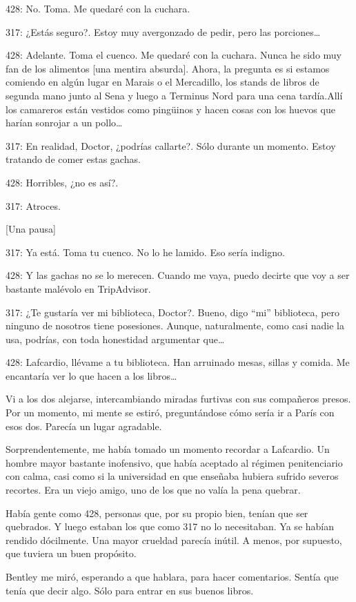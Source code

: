 428: No. Toma. Me quedaré con la cuchara.

317: ¿Estás seguro?. Estoy muy avergonzado de pedir, pero las
porciones\ldots{}

428: Adelante. Toma el cuenco. Me quedaré con la cuchara. Nunca he sido
muy fan de los alimentos {[}una mentira absurda{]}. Ahora, la pregunta
es si estamos comiendo en algún lugar en Marais o el Mercadillo, los
stands de libros de segunda mano junto al Sena y luego a Terminus Nord
para una cena tardía.Allí los camareros están vestidos como pingüinos y
hacen cosas con los huevos que harían sonrojar a un pollo\ldots{}

317: En realidad, Doctor, ¿podrías callarte?. Sólo durante un momento.
Estoy tratando de comer estas gachas.

428: Horribles, ¿no es así?.

317: Atroces.

{[}Una pausa{]}

317: Ya está. Toma tu cuenco. No lo he lamido. Eso sería indigno.

428: Y las gachas no se lo merecen. Cuando me vaya, puedo decirte que
voy a ser bastante malévolo en TripAdvisor.

317: ¿Te gustaría ver mi biblioteca, Doctor?. Bueno, digo ``mi''
biblioteca, pero ninguno de nosotros tiene posesiones. Aunque,
naturalmente, como casi nadie la usa, podrías, con toda honestidad
argumentar que\ldots{}

428: Lafcardio, llévame a tu biblioteca. Han arruinado mesas, sillas y
comida. Me encantaría ver lo que hacen a los libros\ldots{}

Vi a los dos alejarse, intercambiando miradas furtivas con sus
compañeros presos. Por un momento, mi mente se estiró, preguntándose
cómo sería ir a París con esos dos. Parecía un lugar agradable.

Sorprendentemente, me había tomado un momento recordar a Lafcardio. Un
hombre mayor bastante inofensivo, que había aceptado al régimen
penitenciario con calma, casi como si la universidad en que enseñaba
hubiera sufrido severos recortes. Era un viejo amigo, uno de los que no
valía la pena quebrar.

Había gente como 428, personas que, por su propio bien, tenían que ser
quebrados. Y luego estaban los que como 317 no lo necesitaban. Ya se
habían rendido dócilmente. Una mayor crueldad parecía inútil. A menos,
por supuesto, que tuviera un buen propósito.

Bentley me miró, esperando a que hablara, para hacer comentarios. Sentía
que tenía que decir algo. Sólo para entrar en sus buenos libros.

